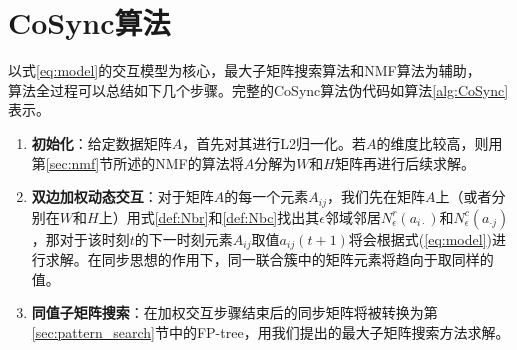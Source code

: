 \section{CoSync算法}
\label{sec:algorithm}
\vspace{-2mm}
以式\ref{eq:model}的交互模型为核心，最大子矩阵搜索算法和NMF算法为辅助，\cosync\\算法全过程可以总结如下几个步骤。完整的CoSync算法伪代码如算法\ref{alg:CoSync}表示。
\begin{enumerate}
\item \textbf{初始化}：给定数据矩阵$A$，首先对其进行L2归一化。若$A$的维度比较高，则用第\ref{sec:nmf}节所述的NMF的算法将$A$分解为$W$和$H$矩阵再进行后续求解。
\item \textbf{双边加权动态交互}：对于矩阵$A$的每一个元素$A_{ij}$，我们先在矩阵$A$上（或者分别在$W$和$H$上）用式\ref{def:Nbr}和\ref{def:Nbc}找出其$\epsilon$邻域邻居$N_{\epsilon}^{r}(a_{i\cdot})$和$N_{\epsilon}^{c}(a_{\cdot{}j})$，那对于该时刻$t$的下一时刻元素$A_{ij}$取值$a_{ij}(t+1)$将会根据式(\ref{eq:model})进行求解。在同步思想的作用下，同一联合簇中的矩阵元素将趋向于取同样的值。
\item \textbf{同值子矩阵搜索}：在加权交互步骤结束后的同步矩阵将被转换为第\ref{sec:pattern_search}节中的FP-tree，用我们提出的最大子矩阵搜索方法求解。
\end{enumerate}

